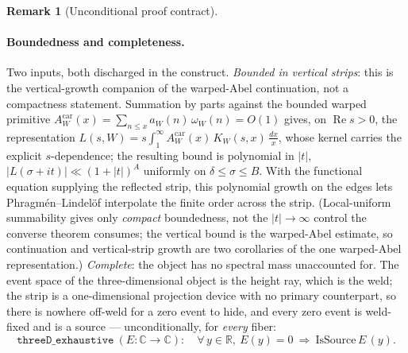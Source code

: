 \documentclass[11pt]{article}
\theoremstyle{definition}
\newtheorem{remark}[theorem]{Remark}
\renewcommand{\Re}{\operatorname{Re}}
\begin{document}
\begin{remark}[Unconditional proof contract]
\begin{enumerate}
\paragraph{Boundedness and completeness.} Two inputs, both discharged in the construct.
\emph{Bounded in vertical strips}: this is the vertical-growth companion of the warped-Abel continuation,
not a compactness statement. Summation by parts against the bounded warped primitive
$A^{\mathrm{car}}_W(x)=\sum_{n\le x}a_W(n)\,\omega_W(n)=O(1)$ gives, on $\Re s>0$, the representation
$L(s,W)=s\int_1^\infty A^{\mathrm{car}}_W(x)\,K_W(s,x)\,\tfrac{dx}{x}$, whose kernel carries the explicit
$s$-dependence; the resulting bound is polynomial in $|t|$, $|L(\sigma+it)|\ll(1+|t|)^{A}$ uniformly on
$\delta\le\sigma\le B$. With the functional equation supplying the reflected strip, this polynomial growth
on the edges lets Phragm\'en--Lindel\"of \cite[\S5.65]{Titchmarsh} interpolate the finite order across the
strip. (Local-uniform summability gives only \emph{compact} boundedness, not the $|t|\to\infty$ control the
converse theorem consumes; the vertical bound is the warped-Abel estimate, so continuation and
vertical-strip growth are two corollaries of the one warped-Abel representation.)
\emph{Complete}: the object has no spectral mass unaccounted for. The event space of the
three-dimensional object is the height ray, which is the weld; the strip is a one-dimensional
projection device with no primary counterpart, so there is nowhere off-weld for a zero event to hide,
and every zero event is weld-fixed and is a source --- unconditionally, for \emph{every} fiber:
\[
  \texttt{threeD\_exhaustive}\ (E:\mathbb C\to\mathbb C):\quad
  \forall\,y\in\mathbb R,\ E(y)=0\ \Rightarrow\ \mathrm{IsSource}\,E\,(y).
\]


\end{enumerate}
\end{remark}
\end{document}
